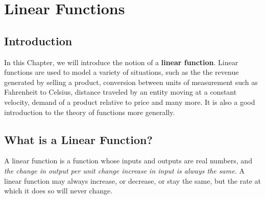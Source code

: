

\chapter{Linear Functions}\label{Chapter:LinearFunctions}

\section*{Introduction}

        In this Chapter, we will introduce the notion of a \textbf{linear function}.  Linear functions are used to model a variety of situations, such as the the revenue generated by selling a product, conversion between units of measurement such as Fahrenheit to Celsius, distance traveled by an entity moving at a constant velocity, demand of a product relative to price and many more.  It is also a good introduction to the theory of functions more generally.


\section{What is a Linear Function?}\label{Section:IntrotoLinear}

A linear function is a function whose inputs and outputs are real numbers, and \textit{the change in output per unit change increase in input is always the same.}  A linear function may always increase, or decrease, or stay the same, but the rate at which it does so will never change.

